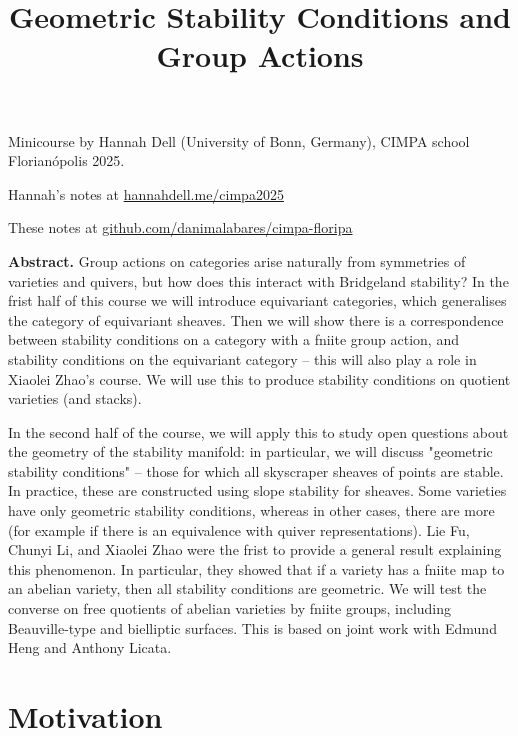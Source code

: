 


\title{Geometric Stability Conditions and
Group Actions}
\maketitle

\noindent
Minicourse by Hannah Dell (University of
Bonn, Germany), CIMPA school Florian\'opolis
2025.

\medskip\noindent
Hannah's notes at
\href{https://www.hannahdell.me/cimpa2025}
{hannahdell.me/cimpa2025}

\medskip\noindent
These notes at
\href{%
http://github.com/danimalabares/cimpa-floripa
}{%
github.com/danimalabares/cimpa-floripa
}

\bigskip\noindent

{\bf Abstract.} Group actions on categories
arise naturally from symmetries of varieties
and quivers, but how does this interact with
Bridgeland stability? In the frist half of
this course we will introduce equivariant
categories, which generalises the category of
equivariant sheaves. Then we will show there
is a correspondence between stability
conditions on a category with a fniite group
action, and stability conditions on the
equivariant category -- this will also play a
role in Xiaolei Zhao's course. We will use
this to produce stability conditions on
quotient varieties (and stacks).

In the second half of the course, we will
apply this to study open questions about the
geometry of the stability manifold: in
particular, we will discuss "geometric
stability conditions" -- those for which all
skyscraper sheaves of points are stable. In
practice, these are constructed using slope
stability for sheaves. Some varieties have
only geometric stability conditions, whereas
in other cases, there are more (for example
if there is an equivalence with quiver
representations). Lie Fu, Chunyi Li, and
Xiaolei Zhao were the frist to provide a
general result explaining this phenomenon. In
particular, they showed that if a variety has
a fniite map to an abelian variety, then all
stability conditions are geometric. We will
test the converse on free quotients of
abelian varieties by fniite groups, including
Beauville-type and bielliptic surfaces. This
is based on joint work with Edmund Heng and
Anthony Licata.

\bigskip\noindent
\tableofcontents
\bigskip\noindent

\section*{Motivation}
\label{section-motivation}

